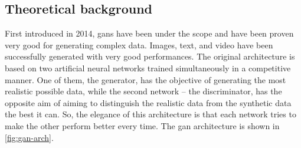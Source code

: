 \subsection{Theoretical background}
First introduced in 2014, \acp{gan} \cite{goodfellow_generative_2014} have been under the scope and have been proven very good for generating complex data. Images, text, and video have been successfully generated with very good performances. %
The original architecture is based on two artificial neural networks trained simultaneously in a competitive manner. One of them, the generator, has the objective of generating the most realistic possible data, while the second network – the discriminator, has the opposite aim of aiming to distinguish the realistic data from the synthetic
data the best it can. So, the elegance of this architecture is that each network tries to
make the other perform better every time. The \ac{gan} architecture is shown in \ref{fig:gan-arch}.

